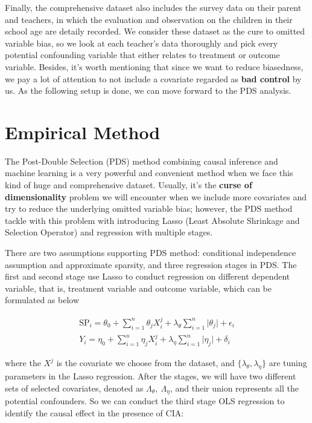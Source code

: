 \documentclass[]{AEA}
\begin{document}
    Finally, the comprehensive dataset also includes the survey data on their parent and teachers, in which the evaluation and observation on the children in their school age are detaily recorded.  We consider these dataset as the cure to omitted variable bias, so we look at each teacher's data thoroughly and pick every potential confounding variable that either relates to treatment or outcome variable.  Besides, it's worth mentioning that since we want to reduce biasedness, we pay a lot of attention to not include a covariate regarded as \textbf{bad control} by us.  As the following setup is done, we can move forward to the PDS analysis.


\section{Empirical Method} %

    The Post-Double Selection (PDS) method combining causal inference and machine learning is a very powerful and convenient method when we face this kind of huge and comprehensive dataset.  Usually, it's the \textbf{curse of dimensionality} problem we will encounter when we include more covariates and try to reduce the underlying omitted variable bias; however, the PDS method tackle with this problem with introducing Lasso (Least Absolute Shrinkage and Selection Operator) and regression with multiple stages.

    There are two assumptions supporting PDS method: conditional independence assumption and approximate sparsity, and three regression stages in PDS.  The first and second stage use Lasso to conduct regression on different dependent variable, that is, treatment variable and outcome variable, which can be formulated as below

    \begin{align}
    \text{SP}_i = \theta_0 + \sum_{i=1}^n \theta_j X_i^j + \lambda_\theta\sum_{i=1}^n \lvert \theta_j \rvert + \epsilon_i \\
    Y_i         = \eta_0   + \sum_{i=1}^n \eta_j X_i^j   + \lambda_\eta\sum_{i=1}^n \lvert \eta_j   \rvert + \delta_i
    \end{align}

    where the $X^j$ is the covariate we choose from the dataset, and $\{\lambda_\theta,\lambda_\eta\}$ are tuning parameters in the Lasso regression.  After the stages, we will have two different sets of selected covariates, denoted as $\Lambda_\theta,\ \Lambda_\eta$, and their union represents all the potential confounders.  So we can conduct the third stage OLS regression to identify the causal effect in the presence of CIA:
\end{document}
